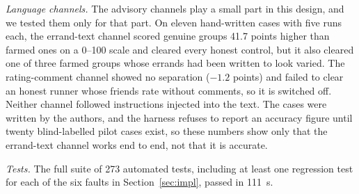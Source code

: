 \emph{Language channels.} The advisory channels play a small part in this design,
and we tested them only for that part. On eleven hand-written cases with five runs
each, the errand-text channel scored genuine groups 41.7 points higher than farmed
ones on a 0--100 scale and cleared every honest control, but it also cleared one of
three farmed groups whose errands had been written to look varied. The
rating-comment channel showed no separation ($-1.2$ points) and failed to clear an
honest runner whose friends rate without comments, so it is switched off. Neither
channel followed instructions injected into the text. The cases were written by the
authors, and the harness refuses to report an accuracy figure until twenty
blind-labelled pilot cases exist, so these numbers show only that the errand-text
channel works end to end, not that it is accurate.

\emph{Tests.} The full suite of 273 automated tests, including at least one
regression test for each of the six faults in Section~\ref{sec:impl}, passed in
111~s.
